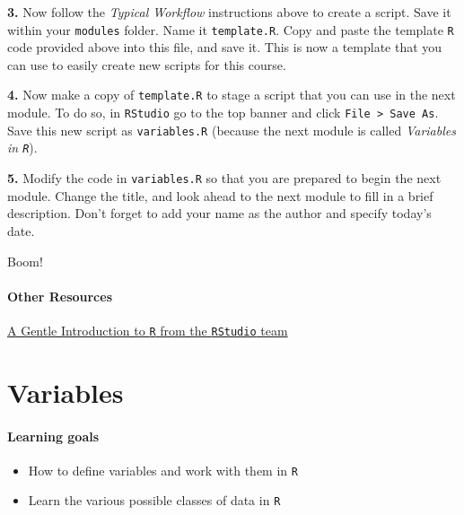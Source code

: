 \documentclass[
]{book}
\providecommand{\tightlist}{%
  \setlength{\itemsep}{0pt}\setlength{\parskip}{0pt}}
\begin{document}
\textbf{3.} Now follow the \emph{Typical Workflow} instructions above to create a script. Save it within your \texttt{modules} folder. Name it \texttt{template.R}. Copy and paste the template \texttt{R} code provided above into this file, and save it. This is now a template that you can use to easily create new scripts for this course.

\textbf{4.} Now make a copy of \texttt{template.R} to stage a script that you can use in the next module. To do so, in \texttt{RStudio} go to the top banner and click \texttt{File\ \textgreater{}\ Save\ As}. Save this new script as \texttt{variables.R} (because the next module is called \emph{Variables in \texttt{R}}).

\textbf{5.} Modify the code in \texttt{variables.R} so that you are prepared to begin the next module. Change the title, and look ahead to the next module to fill in a brief description. Don't forget to add your name as the author and specify today's date.

Boom!

\hypertarget{other-resources-1}{%
\subsubsection*{Other Resources}\label{other-resources-1}}

\href{https://www.rstudio.com/resources/webinars/a-gentle-introduction-to-tidy-statistics-in-r/}{A Gentle Introduction to \texttt{R} from the \texttt{RStudio} team}

\hypertarget{variables}{%
\chapter{Variables}\label{variables}}

\hypertarget{learning-goals-2}{%
\subsubsection*{Learning goals}\label{learning-goals-2}}

\begin{itemize}
\tightlist
\item
  How to define variables and work with them in \texttt{R}\\
\item
  Learn the various possible classes of data in \texttt{R}
\end{itemize}
\end{document}
